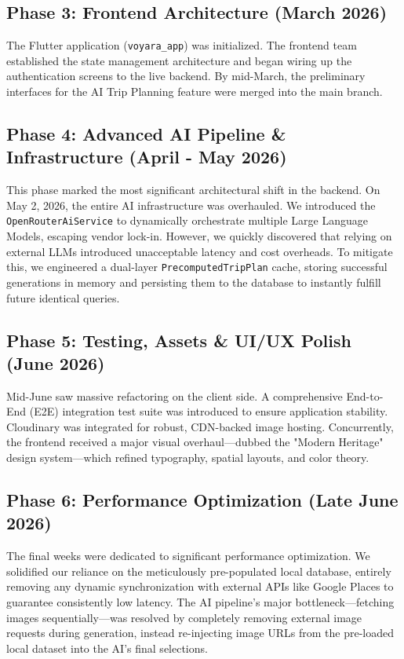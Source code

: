 \subsection{Phase 3: Frontend Architecture (March 2026)}
The Flutter application (\texttt{voyara\_app}) was initialized. The frontend team established the state management architecture and began wiring up the authentication screens to the live backend. By mid-March, the preliminary interfaces for the AI Trip Planning feature were merged into the main branch.

\subsection{Phase 4: Advanced AI Pipeline \& Infrastructure (April - May 2026)}
This phase marked the most significant architectural shift in the backend. On May 2, 2026, the entire AI infrastructure was overhauled. We introduced the \texttt{OpenRouterAiService} \cite{openrouter} to dynamically orchestrate multiple Large Language Models, escaping vendor lock-in. However, we quickly discovered that relying on external LLMs introduced unacceptable latency and cost overheads. To mitigate this, we engineered a dual-layer \texttt{PrecomputedTripPlan} cache, storing successful generations in memory and persisting them to the database to instantly fulfill future identical queries.

\subsection{Phase 5: Testing, Assets \& UI/UX Polish (June 2026)}
Mid-June saw massive refactoring on the client side. A comprehensive End-to-End (E2E) integration test suite was introduced to ensure application stability. Cloudinary was integrated for robust, CDN-backed image hosting. Concurrently, the frontend received a major visual overhaul—dubbed the "Modern Heritage" design system—which refined typography, spatial layouts, and color theory.

\subsection{Phase 6: Performance Optimization (Late June 2026)}
The final weeks were dedicated to significant performance optimization. We solidified our reliance on the meticulously pre-populated local database, entirely removing any dynamic synchronization with external APIs like Google Places to guarantee consistently low latency. The AI pipeline's major bottleneck—fetching images sequentially—was resolved by completely removing external image requests during generation, instead re-injecting image URLs from the pre-loaded local dataset into the AI's final selections.


